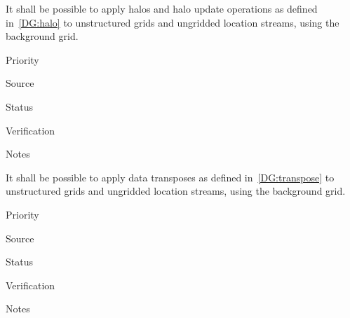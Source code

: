 
It shall be possible to apply halos and halo update operations as
defined in~\ref{DG:halo} to unstructured grids and ungridded location
streams, using the background grid.

\begin{reqlist}
\item[Priority]
\item[Source]
\item[Status]
\item[Verification]
\item[Notes]
\end{reqlist}


It shall be possible to apply data transposes as defined
in~\ref{DG:transpose} to unstructured grids and ungridded location
streams, using the background grid.

\begin{reqlist}
\item[Priority]
\item[Source]
\item[Status]
\item[Verification]
\item[Notes]
\end{reqlist}


